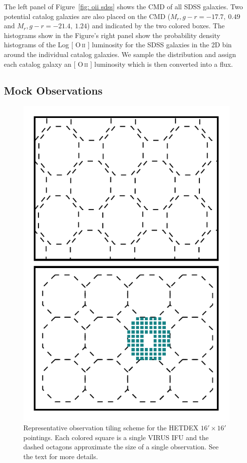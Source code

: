 \documentclass[fleqn,usenatbib]{mnras}
\makeatletter
\DeclareRobustCommand{\ion}[2]{%
\relax\ifmmode
\ifx\testbx\f@series
{\mathbf{#1\,\mathsc{#2}}}\else
{\mathrm{#1\,\mathsc{#2}}}\fi
\else\textup{#1\,{\mdseries\textsc{#2}}}%
\fi}
\makeatother
\begin{document}
The left panel of Figure~\ref{fig: oii sdss} shows the CMD of all SDSS galaxies. Two potential catalog galaxies are also placed on the CMD ($M_r, g-r = -17.7,~0.49$ and $M_r, g-r = -21.4,~1.24$) and indicated by the two colored boxes. The histograms show in the Figure's right panel show the probability density histograms of the Log [\ion{O}{ii}] luminosity for the SDSS galaxies in the 2D bin around the individual catalog galaxies. We sample the distribution and assign each catalog galaxy an [\ion{O}{ii}] luminosity which is then converted into a flux.

\subsection{Mock Observations}\label{sec: observations}
\begin{figure} 
	\includegraphics[width=\columnwidth]{figures/pointings.pdf} 
	\caption{Representative observation tiling scheme for the HETDEX $16' \times 16'$ pointings. Each colored square is a single VIRUS IFU and the dashed octagons approximate the size of a single observation. See the text for more details.} \label{fig: ifu layout} 
\end{figure}
\end{document}
